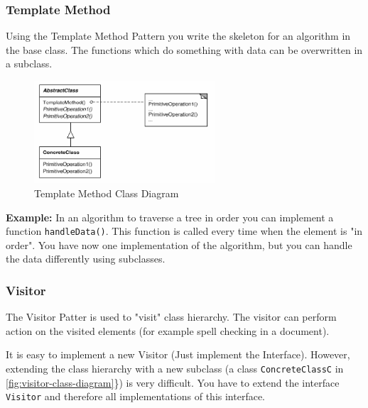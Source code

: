 \documentclass[11pt]{article}
\begin{document}
\subsubsection{Template Method}
\label{sec:org5f6a943}
Using the Template Method Pattern you write the skeleton for an algorithm in the base class.
The functions which do something with data can be overwritten in a subclass.

\begin{figure}[htbp]
\centering
\includegraphics[width=0.6\textwidth]{img/template_method.png}
\caption{\label{fig:template-method-class-diagram}Template Method Class Diagram}
\end{figure}

\textbf{Example:}
In an algorithm to traverse a tree in order you can implement a function \texttt{handleData()}.
This function is called every time when the element is "in order".
You have now one implementation of the algorithm, but you can handle the data differently using subclasses.

\subsubsection{Visitor}
\label{sec:org35d510d}
The Visitor Patter is used to "visit" class hierarchy.
The visitor can perform action on the visited elements (for example spell checking in a document).

It is easy to implement a new Visitor (Just implement the Interface).
However, extending the class hierarchy with a new subclass (a class \texttt{ConcreteClassC} in \ref{fig:visitor-class-diagram}\}) is very difficult.
You have to extend the interface \texttt{Visitor} and therefore all implementations of this interface.
\end{document}
